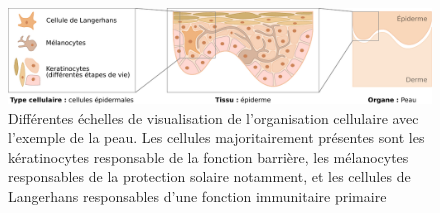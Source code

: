 \begin{figure}
    \centering
    \includegraphics[width=\textwidth]{img/intro/1_context/intro_1_cell_tissue_organ.pdf}
    \caption[Différentes échelles de visualisation de l'organisation cellulaire avec l'exemple de la peau.]{Différentes échelles de visualisation de l'organisation cellulaire avec l'exemple de la peau. Les cellules majoritairement présentes sont les kératinocytes responsable de la fonction barrière, les mélanocytes responsables de la protection solaire notamment, et les cellules de Langerhans responsables d'une fonction immunitaire primaire}
    \label{fig:intro_tissu_type_cellulaire}
\end{figure}

